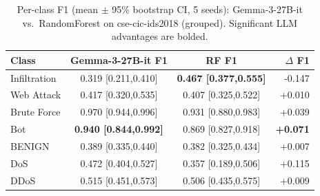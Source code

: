\begin{table}[t]
\caption{Per-class F1 (mean $\pm$ 95\% bootstrap CI, 5 seeds): Gemma-3-27B-it vs.\ RandomForest on cse-cic-ids2018 (grouped). Significant LLM advantages are bolded.}
\label{t:r2_perclass}
\begin{tabular}{lccr}
\hline
Class & Gemma-3-27B-it F1 & RF F1 & $\Delta$ F1 \\
\hline
Infiltration & 0.319 [0.211,0.410] & \textbf{0.467 [0.377,0.555]} & -0.147 \\
Web Attack & 0.417 [0.320,0.535] & 0.407 [0.325,0.522] & +0.010 \\
Brute Force & 0.970 [0.944,0.996] & 0.931 [0.880,0.983] & +0.039 \\
Bot & \textbf{0.940 [0.844,0.992]} & 0.869 [0.827,0.918] & \textbf{+0.071} \\
BENIGN & 0.389 [0.335,0.440] & 0.382 [0.325,0.434] & +0.007 \\
DoS & 0.472 [0.404,0.527] & 0.357 [0.189,0.506] & +0.115 \\
DDoS & 0.515 [0.451,0.573] & 0.506 [0.435,0.575] & +0.009 \\
\hline
\end{tabular}
\end{table}